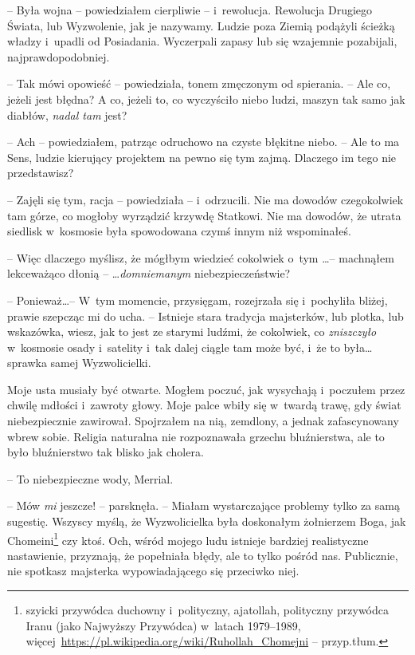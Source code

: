 \documentclass[oneside,polish,11pt,sfheadings]{mwbk}
\begin{document}
-- Była wojna -- powiedziałem cierpliwie -- i~rewolucja. Rewolucja Drugiego
Świata, lub Wyzwolenie, jak je nazywamy. Ludzie poza Ziemią podążyli
ścieżką władzy i~upadli od Posiadania. Wyczerpali zapasy lub się
wzajemnie pozabijali, najprawdopodobniej.

-- Tak mówi opowieść -- powiedziała, tonem zmęczonym od spierania. -- Ale
co, jeżeli jest błędna? A co, jeżeli to, co wyczyściło niebo ludzi,
maszyn tak samo jak diabłów, \textit{nadal tam }jest?

-- Ach -- powiedziałem, patrząc odruchowo na czyste błękitne niebo. -- Ale
to ma Sens, ludzie kierujący projektem na pewno się tym zajmą. Dlaczego
im tego nie przedstawisz?

-- Zajęli się tym, racja -- powiedziała -- i~odrzucili. Nie ma dowodów
czegokolwiek tam górze, co mogłoby wyrządzić krzywdę Statkowi. Nie ma
dowodów, że utrata siedlisk w~kosmosie była spowodowana czymś innym niż
wspominałeś.

-- Więc dlaczego myślisz, że mógłbym wiedzieć cokolwiek o~tym \ldots -- machnąłem lekceważąco dłonią -- \ldots \textit{domniemanym}
niebezpieczeństwie?

-- Ponieważ\ldots -- W~tym momencie, przysięgam, rozejrzała się i~pochyliła
bliżej, prawie szepcząc mi do ucha. -- Istnieje stara tradycja
majsterków, lub plotka, lub wskazówka, wiesz, jak to jest ze starymi
ludźmi, że cokolwiek, co \textit{zniszczyło} w~kosmosie osady i~satelity i~tak dalej ciągle tam może być, i~że to była\ldots sprawka samej
Wyzwolicielki.

Moje usta musiały być otwarte. Mogłem poczuć, jak wysychają i~poczułem
przez chwilę mdłości i~zawroty głowy. Moje palce wbiły się w~twardą
trawę, gdy świat niebezpiecznie zawirował. Spojrzałem na nią, zemdlony,
a jednak zafascynowany wbrew sobie. Religia naturalna nie rozpoznawała
grzechu bluźnierstwa, ale to było bluźnierstwo tak blisko jak cholera. 

-- To niebezpieczne wody, Merrial.

-- Mów \textit{mi} jeszcze! -- parsknęła. -- Miałam wystarczające problemy
tylko za samą sugestię. Wszyscy myślą, że Wyzwolicielka była doskonałym
żołnierzem Boga, jak Chomeini\footnote{ szyicki przywódca duchowny i~polityczny, ajatollah, polityczny przywódca Iranu (jako Najwyższy
Przywódca) w~latach 1979--1989,
więcej~\url{https://pl.wikipedia.org/wiki/Ruhollah\_Chomejni}
-- przyp.tłum.} czy ktoś. Och, wśród mojego ludu istnieje bardziej
realistyczne nastawienie, przyznają, że popełniała błędy, ale to tylko
pośród nas. Publicznie, nie spotkasz majsterka wypowiadającego się
przeciwko niej.
\end{document}
